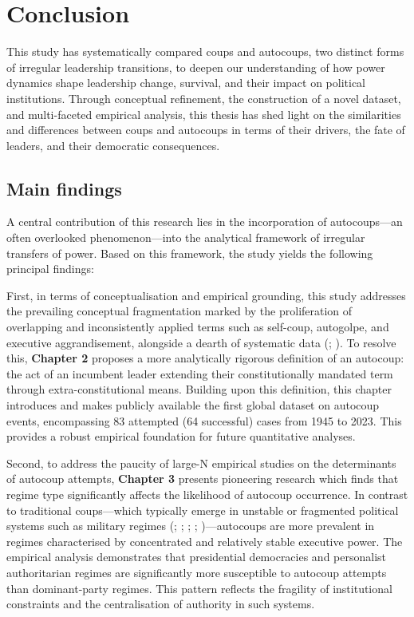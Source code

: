 \documentclass[
  12pt,
]{report}
\begin{document}
\chapter{Conclusion}\label{conclusion}

This study has systematically compared coups and autocoups, two distinct
forms of irregular leadership transitions, to deepen our understanding
of how power dynamics shape leadership change, survival, and their
impact on political institutions. Through conceptual refinement, the
construction of a novel dataset, and multi-faceted empirical analysis,
this thesis has shed light on the similarities and differences between
coups and autocoups in terms of their drivers, the fate of leaders, and
their democratic consequences.

\section{Main findings}\label{main-findings}

A central contribution of this research lies in the incorporation of
autocoups---an often overlooked phenomenon---into the analytical
framework of irregular transfers of power. Based on this framework, the
study yields the following principal findings:

First, in terms of conceptualisation and empirical grounding, this study
addresses the prevailing conceptual fragmentation marked by the
proliferation of overlapping and inconsistently applied terms such as
self-coup, autogolpe, and executive aggrandisement, alongside a dearth
of systematic data (; ). To
resolve this, \textbf{Chapter 2} proposes a more analytically rigorous
definition of an autocoup: the act of an incumbent leader extending
their constitutionally mandated term through extra-constitutional means.
Building upon this definition, this chapter introduces and makes
publicly available the first global dataset on autocoup events,
encompassing 83 attempted (64 successful) cases from 1945 to 2023. This
provides a robust empirical foundation for future quantitative analyses.

Second, to address the paucity of large-N empirical studies on the
determinants of autocoup attempts, \textbf{Chapter 3} presents
pioneering research which finds that regime type significantly affects
the likelihood of autocoup occurrence. In contrast to traditional
coups---which typically emerge in unstable or fragmented political
systems such as military regimes (; ;
;
;
)---autocoups are more
prevalent in regimes characterised by concentrated and relatively stable
executive power. The empirical analysis demonstrates that presidential
democracies and personalist authoritarian regimes are significantly more
susceptible to autocoup attempts than dominant-party regimes. This
pattern reflects the fragility of institutional constraints and the
centralisation of authority in such systems.
\end{document}
